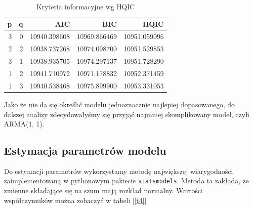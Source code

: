 \documentclass{article}
\theoremstyle{break}
\newcommand{\code}[1]{\colorbox{light-gray}{\texttt{#1}}}
\begin{document}
\begin{table}[H]
	\centering
	\begin{tabular}{|r|r|r|r|r|}
		\hline
		\rowcolor[HTML]{C0C0C0} 
		{\color[HTML]{111111} \textbf{p}} & {\color[HTML]{111111} \textbf{q}} & {\color[HTML]{111111} \textbf{AIC}} & {\color[HTML]{111111} \textbf{BIC}} & {\color[HTML]{111111} \textbf{HQIC}} \\ \hline
		{\color[HTML]{111111} 3}          & {\color[HTML]{111111} 0}          & {\color[HTML]{111111} 10940.398608} & {\color[HTML]{111111} 10969.866469} & {\color[HTML]{111111} 10951.059096}  \\ \hline
		{\color[HTML]{111111} 2}          & {\color[HTML]{111111} 2}          & {\color[HTML]{111111} 10938.737268} & {\color[HTML]{111111} 10974.098700} & {\color[HTML]{111111} 10951.529853}  \\ \hline
		{\color[HTML]{111111} 3}          & {\color[HTML]{111111} 1}          & {\color[HTML]{111111} 10938.935705} & {\color[HTML]{111111} 10974.297137} & {\color[HTML]{111111} 10951.728290}  \\ \hline
		{\color[HTML]{111111} 1}          & {\color[HTML]{111111} 2}          & {\color[HTML]{111111} 10941.710972} & {\color[HTML]{111111} 10971.178832} & {\color[HTML]{111111} 10952.371459}  \\ \hline
		{\color[HTML]{111111} 1}          & {\color[HTML]{111111} 3}          & {\color[HTML]{111111} 10940.538468} & {\color[HTML]{111111} 10975.899900} & {\color[HTML]{111111} 10953.331053}  \\ \hline
	\end{tabular}
\caption{Kryteria informacyjne wg HQIC}
\label{t3}
\end{table}

Jako że nie da się określić modelu jednoznacznie najlepiej dopasowanego, do dalszej analizy zdecydowałyśmy się przyjąć najmniej skomplikowany model, czyli ARMA(1, 1).

\subsection{Estymacja parametrów modelu}
Do estymacji parametrów wykorzystamy metodę największej wiarygodności zaimplementowaną w pythonowym pakiecie \code{statsmodels}. Metoda ta zakłada, że zmienne składające się na szum mają rozkład normalny. Wartości współczynników można zobaczyć w tabeli [\ref{t4}]
\end{document}
